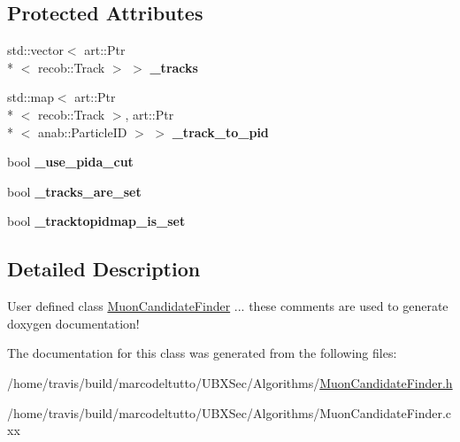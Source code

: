 \subsection*{Protected Attributes}
\begin{DoxyCompactItemize}
\item 
\hypertarget{classubana_1_1MuonCandidateFinder_aa7c96f8b784bcd81512e9c444806f740}{std\-::vector$<$ art\-::\-Ptr\\*
$<$ recob\-::\-Track $>$ $>$ {\bfseries \-\_\-tracks}}\label{classubana_1_1MuonCandidateFinder_aa7c96f8b784bcd81512e9c444806f740}

\item 
\hypertarget{classubana_1_1MuonCandidateFinder_a673e9b7d68a2c3c734fd92ec6e0a87ee}{std\-::map$<$ art\-::\-Ptr\\*
$<$ recob\-::\-Track $>$, art\-::\-Ptr\\*
$<$ anab\-::\-Particle\-I\-D $>$ $>$ {\bfseries \-\_\-track\-\_\-to\-\_\-pid}}\label{classubana_1_1MuonCandidateFinder_a673e9b7d68a2c3c734fd92ec6e0a87ee}

\item 
\hypertarget{classubana_1_1MuonCandidateFinder_a4f0eef92dcbab86d2470da30739be235}{bool {\bfseries \-\_\-use\-\_\-pida\-\_\-cut}}\label{classubana_1_1MuonCandidateFinder_a4f0eef92dcbab86d2470da30739be235}

\item 
\hypertarget{classubana_1_1MuonCandidateFinder_a7275929ef39e422785e7a6dd9d95f5eb}{bool {\bfseries \-\_\-tracks\-\_\-are\-\_\-set}}\label{classubana_1_1MuonCandidateFinder_a7275929ef39e422785e7a6dd9d95f5eb}

\item 
\hypertarget{classubana_1_1MuonCandidateFinder_a46cb4b649e6d2d9b2e6c7641a9fd548a}{bool {\bfseries \-\_\-tracktopidmap\-\_\-is\-\_\-set}}\label{classubana_1_1MuonCandidateFinder_a46cb4b649e6d2d9b2e6c7641a9fd548a}

\end{DoxyCompactItemize}


\subsection{Detailed Description}
User defined class \hyperlink{classubana_1_1MuonCandidateFinder}{Muon\-Candidate\-Finder} ... these comments are used to generate doxygen documentation! 

The documentation for this class was generated from the following files\-:\begin{DoxyCompactItemize}
\item 
/home/travis/build/marcodeltutto/\-U\-B\-X\-Sec/\-Algorithms/\hyperlink{MuonCandidateFinder_8h}{Muon\-Candidate\-Finder.\-h}\item 
/home/travis/build/marcodeltutto/\-U\-B\-X\-Sec/\-Algorithms/Muon\-Candidate\-Finder.\-cxx\end{DoxyCompactItemize}
